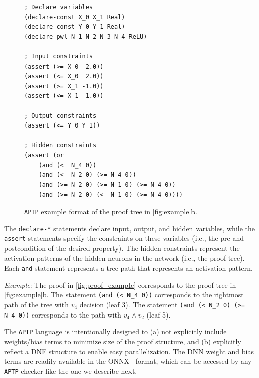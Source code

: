 \documentclass[oneside,11pt,dvipsnames]{book}
\newcommand{\nnproofformat}{\texttt{APTP}}
\newcommand{\mycomment}[3][\color{blue}]{{#1{{#2}: {#3}}}}
\newcommand{\tvn}[1]{\mycomment{TVN}{#1}}{}
\begin{document}
\begin{figure}
\begin{lstlisting}[style=SMTLIB-style, language=SMTLIB]
; Declare variables
(declare-const X_0 X_1 Real)
(declare-const Y_0 Y_1 Real)
(declare-pwl N_1 N_2 N_3 N_4 ReLU)

; Input constraints
(assert (>= X_0 -2.0))
(assert (<= X_0  2.0))
(assert (>= X_1 -1.0))
(assert (<= X_1  1.0))

; Output constraints
(assert (<= Y_0 Y_1)) 

; Hidden constraints
(assert (or 
    (and (<  N_4 0))
    (and (<  N_2 0) (>= N_4 0))
    (and (>= N_2 0) (>= N_1 0) (>= N_4 0))
    (and (>= N_2 0) (<  N_1 0) (>= N_4 0))))
\end{lstlisting}
\caption{\nnproofformat{} example format of the proof tree in \autoref{fig:example}b. 
}
\label{fig:proof_example}
\end{figure}


The \texttt{declare-*} statements declare input, output, and hidden variables, while the \texttt{assert} statements specify the constraints on these variables (i.e., the pre and postcondition of the desired property).
The hidden constraints represent the activation patterns of the hidden neurons in the network (i.e., the proof tree). Each \texttt{and} statement represents a tree path that represents an activation pattern. 



\emph{Example}: The proof in \autoref{fig:proof_example} corresponds to the proof tree in \autoref{fig:example}b. The statement \texttt{(and (< N\_4 0))} corresponds to the rightmost path of the tree with $\overline{v_4}$ decision (leaf 3).  The statement \texttt{(and (< N\_2 0) (>= N\_4 0))} corresponds to the path with $v_4 \land \overline{v_2}$ (leaf 5). 

The \nnproofformat{} language is intentionally designed to (a) not explicitly include weights/bias terms to minimize size of the proof structure, and (b) explicitly reflect a DNF structure to enable easy parallelization.
The DNN weight and bias terms are readily available in the ONNX~\cite{onnx} format, which can be accessed by any \nnproofformat{} checker like the one we describe next.
\end{document}
